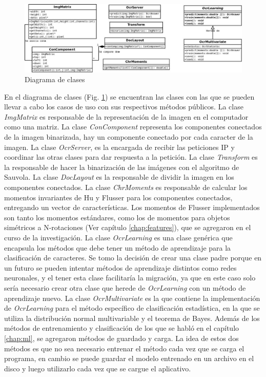 \documentclass[a4paper, 11pt, oneside]{report}
\begin{document}
\begin{figure}
\begin{center}
\includegraphics[width=20cm]{diagrams/clases.jpg}
\end{center}
\caption{Diagrama de clases}
\label{fig:classes}
\end{figure}
En el diagrama de clases (Fig. \ref{fig:classes}) se encuentran las clases con las que se pueden llevar a cabo los casos de uso con sus respectivos métodos públicos. La clase {\it ImgMatrix} es responsable de la representación de la imagen en el computador como una matriz. La clase {\it ConComponent} representa los componentes conectados de la imagen binarizada, hay un componente conectado por cada caracter de la imagen. La clase {\it OcrServer}, es la encargada de recibir las peticiones IP y coordinar las otras clases para dar respuesta a la petición. La clase {\it Transform} es la responsable de hacer la binarización de las imágenes con el algoritmo de Sauvola. La clase {\it DocLayout} es la responsable de dividir la imagen en los componentes conectados. La clase {\it ChrMoments} es responsable de calcular los momentos invariantes de Hu y Flusser para los componentes conectados, entregando un vector de características. Los momentos de Flusser implementados son tanto los momentos estándares, como los de momentos para objetos simétricos a N-rotaciones (Ver capítulo \ref{chap:features}), que se agregaron en el curso de la investigación.
La clase {\it OcrLearning} es una clase genérica que encapsula los métodos que debe tener un método de aprendizaje para la clasificación de caracteres. Se tomo la decisión de crear una clase padre porque en un futuro se pueden intentar métodos de aprendizaje distintos como redes neuronales, y el tener esta clase facilitaría la migración, ya que en este caso solo sería necesario crear otra clase que herede de {\it OcrLearning} con un método de aprendizaje nuevo. La clase {\it OcrMultivariate} es la que contiene la implementación de {\it OcrLearning} para el método específico de clasificación estadística, en la que se utiliza la distribución normal multivariable y el teorema de Bayes. Además de los métodos de entrenamiento y clasificación de los que se habló en el capítulo \ref{chap:ml}, se agregaron métodos de guardado y carga. La idea de estos dos métodos es que no sea necesario entrenar el método cada vez que se carga el programa, en cambio se puede guardar el modelo entrenado en un archivo en el disco y luego utilizarlo cada vez que se cargue el aplicativo.
\end{document}
